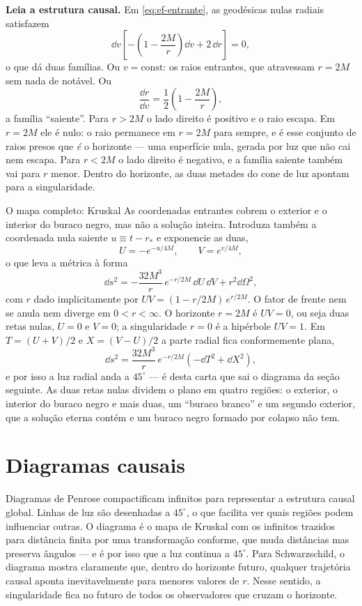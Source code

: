 \documentclass[12pt,a4paper,oneside]{book}
\theoremstyle{rgplain}
\theoremstyle{rgremark}
\begin{document}
\begin{etapas}
  \item \textbf{Leia a estrutura causal.} Em \eqref{eq:ef-entrante}, as
  geodésicas nulas radiais satisfazem
  \[
    \dd v\left[-\left(1-\frac{2M}{r}\right)\dd v+2\,\dd r\right]=0,
  \]
  o que dá duas famílias. Ou $v=\text{const}$: os raios entrantes, que
  atravessam $r=2M$ sem nada de notável. Ou
  \[
    \frac{\dd r}{\dd v}=\frac12\left(1-\frac{2M}{r}\right),
  \]
  a família ``saiente''. Para $r>2M$ o lado direito é positivo e o raio escapa.
  Em $r=2M$ ele é nulo: o raio permanece em $r=2M$ para sempre, e é esse
  conjunto de raios presos que \emph{é} o horizonte --- uma superfície nula,
  gerada por luz que não cai nem escapa. Para $r<2M$ o lado direito é negativo,
  e a família saiente também vai para $r$ menor. Dentro do horizonte, as duas
  metades do cone de luz apontam para a singularidade.
\end{etapas}

\begin{interludio}{O mapa completo: Kruskal}
As coordenadas entrantes cobrem o exterior e o interior do buraco negro, mas não
a solução inteira. Introduza também a coordenada nula saiente $u\equiv t-r_*$ e
exponencie as duas,
\[
  U=-e^{-u/4M},\qquad V=e^{v/4M},
\]
o que leva a métrica à forma
\[
  \dd s^2=-\frac{32M^3}{r}\,e^{-r/2M}\,\dd U\,\dd V+r^2\dd\Omega^2 ,
\]
com $r$ dado implicitamente por $UV=(1-r/2M)\,e^{r/2M}$. O fator de frente nem
se anula nem diverge em $0<r<\infty$. O horizonte $r=2M$
é $UV=0$, ou seja duas retas nulas, $U=0$ e $V=0$; a singularidade $r=0$ é a
hipérbole $UV=1$. Em $T=(U+V)/2$ e $X=(V-U)/2$ a parte radial fica
conformemente plana,
\[
  \dd s^2=\frac{32M^3}{r}\,e^{-r/2M}\left(-\dd T^2+\dd X^2\right),
\]
e por isso a luz radial anda a $45^\circ$ --- é desta carta que sai o diagrama
da seção seguinte. As duas retas nulas dividem o plano em quatro regiões: o exterior, o
interior do buraco negro e mais duas, um ``buraco branco'' e um segundo
exterior, que a solução eterna contém e um buraco negro formado por colapso
não tem.
\end{interludio}

\section{Diagramas causais}

Diagramas de Penrose compactificam infinitos para representar a estrutura
causal global. Linhas de luz são desenhadas a $45^\circ$, o que facilita ver
quais regiões podem influenciar outras. O diagrama é o mapa de Kruskal com os
infinitos trazidos para distância finita por uma transformação conforme, que
muda distâncias mas preserva ângulos --- e é por isso que a luz continua a
$45^\circ$. Para Schwarzschild, o diagrama mostra
claramente que, dentro do horizonte futuro, qualquer trajetória causal aponta
inevitavelmente para menores valores de $r$. Nesse sentido, a singularidade
fica no futuro de todos os observadores que cruzam o horizonte.
\end{document}
